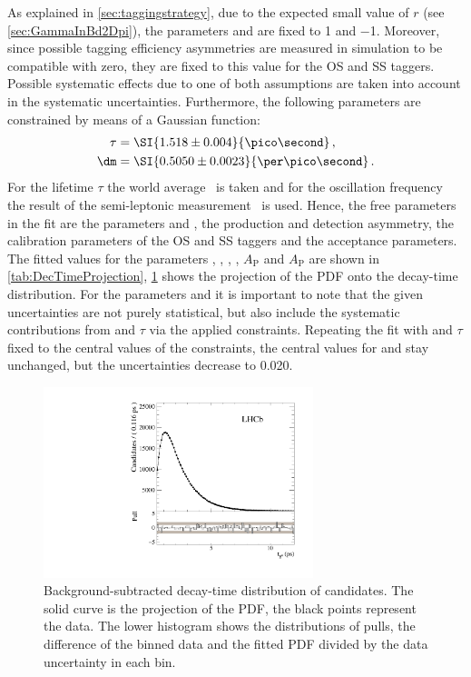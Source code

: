 As explained in \cref{sec:taggingstrategy}, due to the expected small value of $r$ (see \cref{sec:GammaInBd2Dpi}), the parameters \Cf and \Cfbar are fixed to \num{1} and \num{-1}.
Moreover, since possible tagging efficiency asymmetries are measured in simulation to be compatible with zero, they are fixed to this value for the OS and SS taggers.
Possible systematic effects due to one of both assumptions are taken into account in the systematic uncertainties.
Furthermore, the following parameters are constrained by means of a Gaussian function:
\begin{equation}
\begin{aligned}
\tau&=\SI{1.518\pm0.004}{\pico\second}\,,\\
\dm&=\SI{0.5050\pm0.0023}{\per\pico\second}\,.
\end{aligned}
\end{equation}
For the lifetime $\tau$ the world average~\cite{PDG_2017} is taken and for the oscillation frequency \dm the result of the semi-leptonic \lhcb measurement~\cite{Aaij:2016fdk} is used.
Hence, the free parameters in the fit are the \CP parameters \Sf and \Sfbar, the production and detection asymmetry, the calibration parameters of the OS and SS taggers and the acceptance parameters.
The fitted values for the parameters \Sf, \Sfbar, \dm, \DG, $A_{\text{P}}$ and $A_{\text{P}}$ are shown in \cref{tab:DecTimeProjection}, \cref{fig:DecTimeProjection} shows the projection of the PDF onto the decay-time distribution.
For the \CP parameters \Sf and \Sfbar it is important to note that the given uncertainties are not purely statistical, but also include the systematic contributions from \dm and $\tau$ via the applied constraints.
Repeating the fit with \dm and $\tau$ fixed to the central values of the constraints, the central values for \Sf and \Sfbar stay unchanged, but the uncertainties decrease to \num{0.020}.
\begin{figure}[tbp]
    \centering
    \includegraphics[width=0.7\textwidth]{09TimeFit/figs/BeautyTime_pull.pdf}
    \caption{Background-subtracted decay-time distribution of \BdToDpi candidates.
    The solid curve is the projection of the PDF, the black points represent the data.
    The lower histogram shows the distributions of pulls, \ie the difference of the binned data and the fitted PDF divided by the data uncertainty in each bin.}
    \label{fig:DecTimeProjection}
\end{figure}

